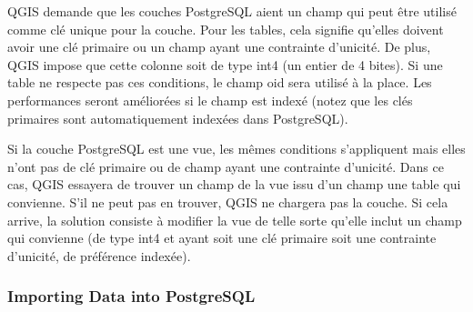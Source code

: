 QGIS demande que les couches PostgreSQL aient un champ qui peut \^etre utilis\'e comme cl\'e unique pour la couche. Pour les tables, cela signifie qu'elles doivent avoir une cl\'e primaire ou un champ ayant une contrainte d'unicit\'e. De plus, QGIS impose que cette colonne soit de type int4 (un entier de 4 bites). Si une table ne respecte pas ces conditions, le champ oid sera utilis\'e \`a la place. Les performances seront am\'elior\'ees si le champ est index\'e (notez que les cl\'es primaires sont automatiquement index\'ees dans PostgreSQL).

Si la couche PostgreSQL est une vue, les m\^emes conditions s'appliquent mais elles n'ont pas de cl\'e primaire ou de champ ayant une contrainte d'unicit\'e. Dans ce cas, QGIS essayera de trouver un champ de la vue issu d'un champ une table qui convienne. S'il ne peut pas en trouver, QGIS ne chargera pas la couche. Si cela arrive, la solution consiste \`a modifier la vue de telle sorte qu'elle inclut un champ qui convienne (de type int4 et ayant soit une cl\'e primaire soit une contrainte d'unicit\'e, de pr\'ef\'erence index\'ee).

\subsubsection{Importing Data into PostgreSQL}\label{sec:loading_postgis_data}

